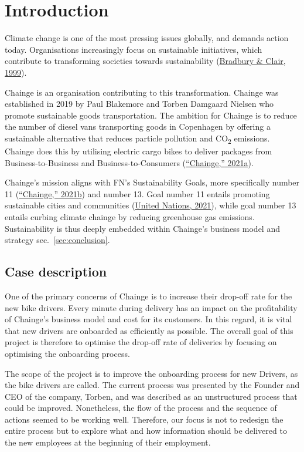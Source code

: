 \hypertarget{sec:introduction}{%
\section{Introduction}\label{sec:introduction}}

Climate change is one of the most pressing issues globally, and demands
action today. Organisations increasingly focus on sustainable
initiatives, which contribute to transforming societies towards
sustainability (\protect\hyperlink{ref-bradbury1999}{Bradbury \& Clair,
1999}).

Chainge is an organisation contributing to this transformation. Chainge
was established in 2019 by Paul Blakemore and Torben Damgaard Nielsen
who promote sustainable goods transportation. The ambition for Chainge
is to reduce the number of diesel vans transporting goods in Copenhagen
by offering a sustainable alternative that reduces particle pollution
and CO\textsubscript{2} emissions. Chainge does this by utilising
electric cargo bikes to deliver packages from Business-to-Business and
Business-to-Consumers
(\protect\hyperlink{ref-chaingeA2021}{{``Chainge,''} 2021a}).

Chainge's mission aligns with FN's Sustainability Goals, more
specifically number 11
(\protect\hyperlink{ref-chaingeB2021}{{``Chainge,''} 2021b}) and number
13. Goal number 11 entails promoting sustainable cities and communities
(\protect\hyperlink{ref-un2021sustainable}{United Nations, 2021}), while
goal number 13 entails curbing climate chainge by reducing greenhouse
gas emissions. Sustainability is thus deeply embedded within Chainge's
business model and strategy sec.~\ref{sec:conclusion}.

\hypertarget{sec:case_description}{%
\subsection{Case description}\label{sec:case_description}}

One of the primary concerns of Chainge is to increase their drop-off
rate for the new bike drivers. Every minute during delivery has an
impact on the profitability of Chainge's business model and cost for its
customers. In this regard, it is vital that new drivers are onboarded as
efficiently as possible. The overall goal of this project is therefore
to optimise the drop-off rate of deliveries by focusing on optimising
the onboarding process.

The scope of the project is to improve the onboarding process for new
Drivers, as the bike drivers are called. The current process was
presented by the Founder and CEO of the company, Torben, and was
described as an unstructured process that could be improved.
Nonetheless, the flow of the process and the sequence of actions seemed
to be working well. Therefore, our focus is not to redesign the entire
process but to explore what and how information should be delivered to
the new employees at the beginning of their employment.


